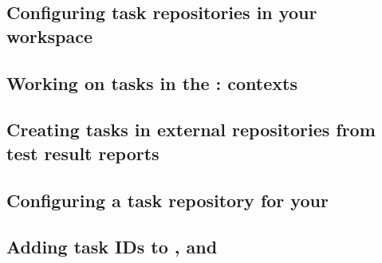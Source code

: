 

\subsection{Configuring task repositories in your workspace}
\label{TasksALMConfigureWorkspace}


\subsection{Working on tasks in the \ite{}: contexts}


\subsection{Creating tasks in external repositories from test result reports}


\subsection{Configuring a task repository for your \gdproject{}}
\label{TasksALMConfigureProject}


\subsection{Adding task IDs to \gdjobs{}, \gdsuites{} and \gdcases{}}
\label{TasksALMAddTask}


